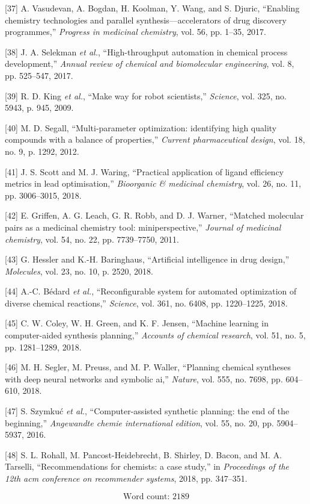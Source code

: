 \documentclass[11pt]{article}
\begin{document}
\hypertarget{citeproc_bib_item_37}{[37] A. Vasudevan, A. Bogdan, H. Koolman, Y. Wang, and S. Djuric, “Enabling chemistry technologies and parallel synthesis—accelerators of drug discovery programmes,” \textit{Progress in medicinal chemistry}, vol. 56, pp. 1–35, 2017.}

\hypertarget{citeproc_bib_item_38}{[38] J. A. Selekman \textit{et al.}, “High-throughput automation in chemical process development,” \textit{Annual review of chemical and biomolecular engineering}, vol. 8, pp. 525–547, 2017.}

\hypertarget{citeproc_bib_item_39}{[39] R. D. King \textit{et al.}, “Make way for robot scientists,” \textit{Science}, vol. 325, no. 5943, p. 945, 2009.}

\hypertarget{citeproc_bib_item_40}{[40] M. D. Segall, “Multi-parameter optimization: identifying high quality compounds with a balance of properties,” \textit{Current pharmaceutical design}, vol. 18, no. 9, p. 1292, 2012.}

\hypertarget{citeproc_bib_item_41}{[41] J. S. Scott and M. J. Waring, “Practical application of ligand efficiency metrics in lead optimisation,” \textit{Bioorganic \& medicinal chemistry}, vol. 26, no. 11, pp. 3006–3015, 2018.}

\hypertarget{citeproc_bib_item_42}{[42] E. Griffen, A. G. Leach, G. R. Robb, and D. J. Warner, “Matched molecular pairs as a medicinal chemistry tool: miniperspective,” \textit{Journal of medicinal chemistry}, vol. 54, no. 22, pp. 7739–7750, 2011.}

\hypertarget{citeproc_bib_item_43}{[43] G. Hessler and K.-H. Baringhaus, “Artificial intelligence in drug design,” \textit{Molecules}, vol. 23, no. 10, p. 2520, 2018.}

\hypertarget{citeproc_bib_item_44}{[44] A.-C. Bédard \textit{et al.}, “Reconfigurable system for automated optimization of diverse chemical reactions,” \textit{Science}, vol. 361, no. 6408, pp. 1220–1225, 2018.}

\hypertarget{citeproc_bib_item_45}{[45] C. W. Coley, W. H. Green, and K. F. Jensen, “Machine learning in computer-aided synthesis planning,” \textit{Accounts of chemical research}, vol. 51, no. 5, pp. 1281–1289, 2018.}

\hypertarget{citeproc_bib_item_46}{[46] M. H. Segler, M. Preuss, and M. P. Waller, “Planning chemical syntheses with deep neural networks and symbolic ai,” \textit{Nature}, vol. 555, no. 7698, pp. 604–610, 2018.}

\hypertarget{citeproc_bib_item_47}{[47] S. Szymkuć \textit{et al.}, “Computer-assisted synthetic planning: the end of the beginning,” \textit{Angewandte chemie international edition}, vol. 55, no. 20, pp. 5904–5937, 2016.}

\hypertarget{citeproc_bib_item_48}{[48] S. L. Rohall, M. Pancost-Heidebrecht, B. Shirley, D. Bacon, and M. A. Tarselli, “Recommendations for chemists: a case study,” in \textit{Proceedings of the 12th acm conference on recommender systems}, 2018, pp. 347–351.}\bigskip

\[\text{Word count: } 2189\]
\end{document}
